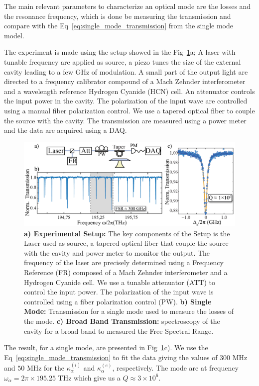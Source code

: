 The main relevant parameters to characterize an optical mode are the losses and the resonance frequency, which is done be measuring the transmission and compare with the Eq~\ref{eq:single_mode_transmission} from the single mode model. 

The experiment is made using the setup showed in the  Fig~\ref{fig:exp_mode_charac}a; A laser with tunable frequency are applied as source, a piezo tunes the size of the external cavity leading to a few GHz of modulation. A small part of the output light are directed to a frequency calibrator compound of a Mach Zehnder interferometer and a wavelength reference Hydrogen Cyanide (HCN) cell. An attenuator controls the input power in the cavity. The polarization of the input wave are controlled using a manual fiber polarization control. We use a tapered optical fiber to couple the source with the cavity. The transmission are measured using a power meter and the data are acquired using a DAQ. 
\begin{figure}[h!]
    \centering
    \includegraphics[width = 16cm]{figuras/Dissertation_optical_char_exp.jpg}
    \caption{\textbf{a) Experimental Setup:} The key components of the Setup is the Laser used as source, a tapered optical fiber that couple the source with the cavity and power meter to monitor the output. The frequency of the laser are precisely determined using a Frequency Reference (FR) composed of a Mach Zehnder interferometer and a Hydrogen Cyanide cell. We use a tunable attenuator (ATT) to control the input power. The polarization of the input wave is controlled using a fiber polarization control (PW). \textbf{b) Single Mode:} Transmission for a single mode used to measure the losses of the mode. \textbf{c) Broad Band Transmission:} spectroscopy of the cavity for a broad band to measured the Free Spectral Range.} 
    \label{fig:exp_mode_charac}
\end{figure}

The result, for a single mode, are presented in Fig~\ref{fig:exp_mode_charac}c). We use the Eq~\ref{eq:single_mode_transmission} to fit the data giving the values of $300$ MHz and $50$ MHz for the $\kappa_\alpha^{(i)}$ and $\kappa_\alpha^{(e)}$, respectively. The mode are at frequency $\omega_\alpha = 2\pi\times195.25$ THz which give us a $Q \approx 3\times10^6$.

